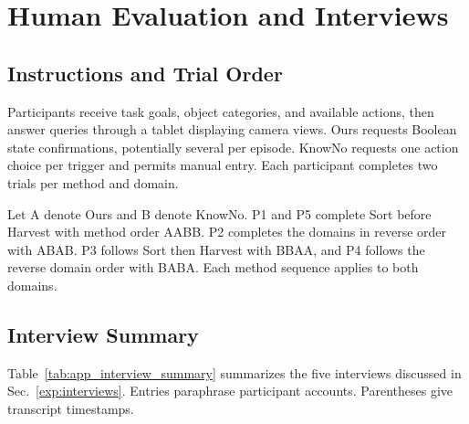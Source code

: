 \section{Human Evaluation and Interviews}\label{appx:user}
\subsection{Instructions and Trial Order}\label{appx:user_scenarios}\label{appx:user_assignment}
Participants receive task goals, object categories, and available actions, then answer queries through a tablet displaying camera views. Ours requests Boolean state confirmations, potentially several per episode. KnowNo requests one action choice per trigger and permits manual entry. Each participant completes two trials per method and domain.

Let A denote Ours and B denote KnowNo. P1 and P5 complete Sort before Harvest with method order AABB. P2 completes the domains in reverse order with ABAB. P3 follows Sort then Harvest with BBAA, and P4 follows the reverse domain order with BABA. Each method sequence applies to both domains.

\subsection{Interview Summary}\label{appx:user_interviews}
Table~\ref{tab:app_interview_summary} summarizes the five interviews discussed in Sec.~\ref{exp:interviews}. Entries paraphrase participant accounts. Parentheses give transcript timestamps.

